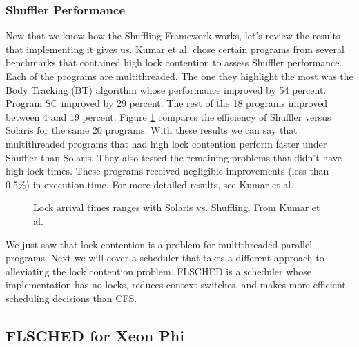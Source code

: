 \documentclass{sig-alternate}
\begin{document}
\subsubsection{Shuffler Performance}

Now that we know how the Shuffling Framework works, let's review the results that implementing it gives us. Kumar et al. chose certain programs from several benchmarks that contained high lock contention to assess Shuffler performance.  Each of the programs are multithreaded. The one they highlight the most was the Body Tracking (BT) algorithm whose performance improved by 54 percent. Program SC improved by 29 percent. The rest of the 18 programs improved between 4 and 19 percent. Figure \ref{fig:shuf_vs_solaris} compares the efficiency of Shuffler versus Solaris for the same 20 programs. With these results we can say that multithreaded programs that had high lock contention perform faster under Shuffler than Solaris. They also tested the remaining problems that didn't have high lock times. These programs received negligible improvements (less than 0.5\%) in execution time. For more detailed results, see Kumar et al.~\cite{Kumar:2014}

\begin{figure}
\centering
{}
\caption{Lock arrival times ranges with Solaris vs. Shuffling. From Kumar et al.~\cite{Kumar:2014}}
\label{fig:shuf_vs_solaris}
\end{figure}

We just saw that lock contention is a problem for multithreaded parallel programs. Next we will cover a scheduler that takes a different approach to alleviating the lock contention problem. FLSCHED is a scheduler whose implementation has no locks, reduces context switches, and makes more efficient scheduling decisions than CFS.~\cite{Jo:2017}

\subsection{FLSCHED for Xeon Phi}
\label{sec:flsched}
\end{document}

